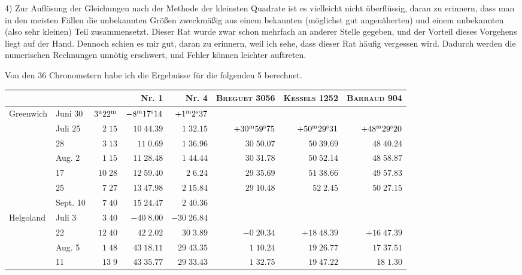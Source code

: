 4) Zur Auflösung der Gleichungen nach der Methode der kleinsten Quadrate ist es vielleicht nicht überflüssig, daran zu erinnern, dass man in den meisten Fällen die unbekannten Größen zweckmäßig aus einem bekannten (möglichst gut angenäherten) und einem unbekannten (also sehr kleinen) Teil zusammensetzt. Dieser Rat wurde zwar schon mehrfach an anderer Stelle gegeben, und der Vorteil dieses Vorgehens liegt auf der Hand. Dennoch schien es mir gut, daran zu erinnern, weil ich sehe, dass dieser Rat häufig vergessen wird. Dadurch werden die numerischen Rechnungen unnötig erschwert, und Fehler können leichter auftreten.

Von den 36 Chronometern habe ich die Ergebnisse für die folgenden 5 berechnet.

\begin{center}
\begingroup\fontsize{8}{10}\selectfont\setlength{\tabcolsep}{2pt}
\begin{tabular}{ll|r|r|r|r|r|r}
 & & & Nr. 1 & Nr. 4 & \textsc{Breguet} 3056 & \textsc{Kessels} 1252 & \textsc{Barraud} 904 \\
\hline
Greenwich & Juni 30 & $3^{\rm u}22^{\rm m}$ & $-8^{\rm m}17^{\rm s}14$ & $+1^{\rm m}2^{\rm s}37$ &  &  &  \\
 & Juli 25 & $2\;15$ & $10\;44.39$ & $1\;32.15$ & $+30^{\rm m}59^{\rm s}75$ & $+50^{\rm m}29^{\rm s}31$ & $+48^{\rm m}29^{\rm s}20$ \\
 & 28 & $3\;13$ & $11\;0.69$ & $1\;36.96$ & $30\;50.07$ & $50\;39.69$ & $48\;40.24$ \\
 & Aug. 2 & $1\;15$ & $11\;28.48$ & $1\;44.44$ & $30\;31.78$ & $50\;52.14$ & $48\;58.87$ \\
 & 17 & $10\;28$ & $12\;59.40$ & $2\;6.24$ & $29\;35.69$ & $51\;38.66$ & $49\;57.83$ \\
 & 25 & $7\;27$ & $13\;47.98$ & $2\;15.84$ & $29\;10.48$ & $52\;2.45$ & $50\;27.15$ \\
 & Sept. 10 & $7\;40$ & $15\;24.47$ & $2\;40.36$ &  &  &  \\
Helgoland & Juli 3 & $3\;40$ & $-40\;8.00$ & $-30\;26.84$ &  &  &  \\
 & 22 & $12\;40$ & $42\;2.02$ & $30\;3.89$ & $-0\;20.34$ & $+18\;48.39$ & $+16\;47.39$ \\
 & Aug. 5 & $1\;48$ & $43\;18.11$ & $29\;43.35$ & $1\;10.24$ & $19\;26.77$ & $17\;37.51$ \\
 & 11 & $13\;9$ & $43\;35.77$ & $29\;33.43$ & $1\;32.75$ & $19\;47.22$ & $18\;1.30$ \\

\end{tabular}
\end{center}
